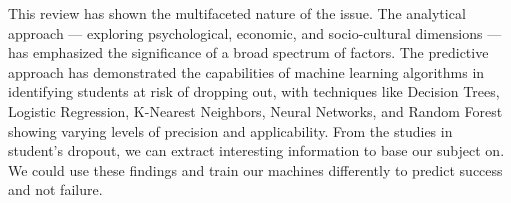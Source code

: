 \documentclass[../../main.tex]{subfiles}
\begin{document}
This review has shown the multifaceted nature of the issue. The analytical approach — exploring psychological, economic, and socio-cultural dimensions — has emphasized the significance of a broad spectrum of factors. The predictive approach has demonstrated the capabilities of machine learning algorithms in identifying students at risk of dropping out, with techniques like Decision Trees, Logistic Regression, K-Nearest Neighbors, Neural Networks, and Random Forest showing varying levels of precision and applicability.
From the studies in student's dropout, we can extract interesting information to base our subject on. We could use these findings and train our machines differently to predict success and not failure.
\end{document}
